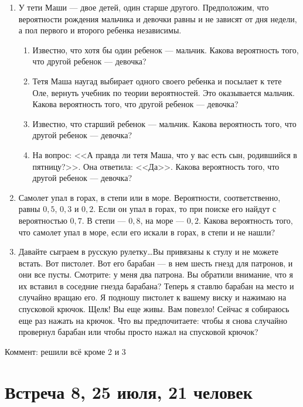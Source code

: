 \documentclass[pdftex,12pt,a4paper]{article}
\begin{document}
\begin{enumerate}
\item У тети Маши --- двое детей, один старше другого. Предположим, что вероятности рождения мальчика и девочки равны и не зависят от дня недели, а пол первого и второго ребенка независимы. 
\begin{enumerate}
\item Известно, что хотя бы один ребенок --- мальчик. Какова
вероятность того, что другой ребенок --- девочка?
\item Тетя Маша наугад выбирает одного своего
ребенка и посылает к тете Оле, вернуть учебник по теории
вероятностей. Это оказывается мальчик. Какова вероятность того,
что другой ребенок --- девочка? 
\item Известно, что старший ребенок --- мальчик. Какова вероятность того, что другой ребенок --- девочка? 
\item На вопрос: <<А правда ли тетя Маша, что у вас есть сын, родившийся в пятницу?>>. Она ответила: <<Да>>. Какова вероятность того, что другой ребенок --- девочка?
\end{enumerate}

\item Самолет упал в горах, в степи или в море. Вероятности,
соответственно, равны $0,5$, $0,3$ и $0,2$. Если он упал в горах,
то при поиске его найдут с вероятностью $0,7$. В степи --- $0,8$, на
море --- $0,2$. Какова вероятность того, что самолет упал в море, если его искали в горах, в степи и не нашли?

\item Давайте сыграем в русскую рулетку\ldots Вы привязаны к стулу и не
можете встать. Вот пистолет. Вот его барабан --- в нем шесть гнезд
для патронов, и они все пусты. Смотрите: у меня два патрона. Вы
обратили внимание, что я их вставил в соседние гнезда барабана?
Теперь я ставлю барабан на место и случайно вращаю его. Я подношу пистолет
к вашему виску и нажимаю на спусковой крючок. Щелк! Вы еще живы.
Вам повезло! Сейчас я собираюсь еще раз нажать на крючок. Что вы
предпочитаете: чтобы я снова случайно провернул барабан или чтобы просто
нажал на спусковой крючок?

\end{enumerate}

Коммент: решили всё кроме 2 и 3


\newpage
\section{Встреча 8, 25 июля, 21 человек}
\end{document}
